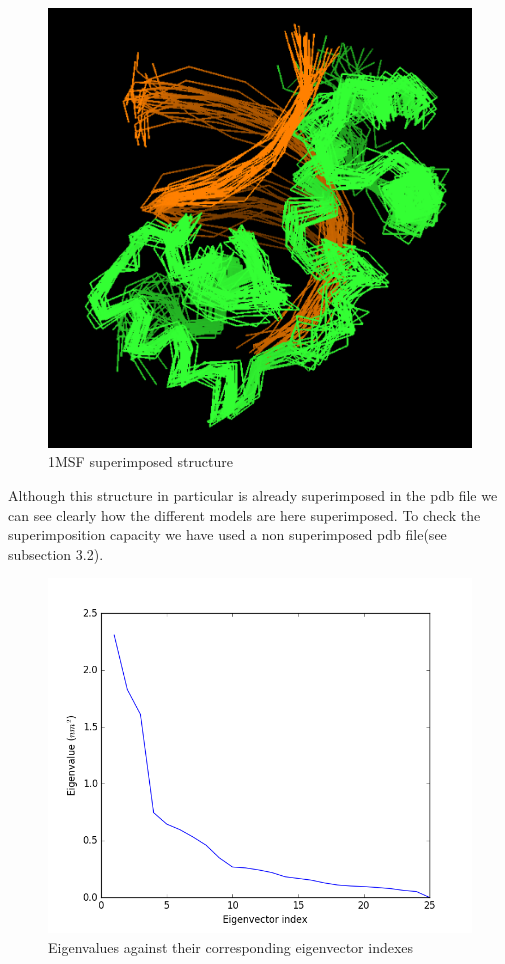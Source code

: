 \documentclass[12pt]{article}
\begin{document}
\begin{figure} [h]
\centering
\includegraphics[scale=0.4]{pymol_1mSF}
\caption{1MSF superimposed structure}
\label{fig:1MSF_super}
\end{figure}

Although this structure in particular is already superimposed in the pdb file we can see clearly how the different models are here superimposed. To check the superimposition capacity we have used a non superimposed pdb file(see subsection 3.2). 

\begin{figure} [h]
\centering
\includegraphics[scale=0.6]{1MSF_figure}
\caption{Eigenvalues against their corresponding eigenvector indexes}
\label{fig:1MSF_figure}
\end{figure}
\end{document}
